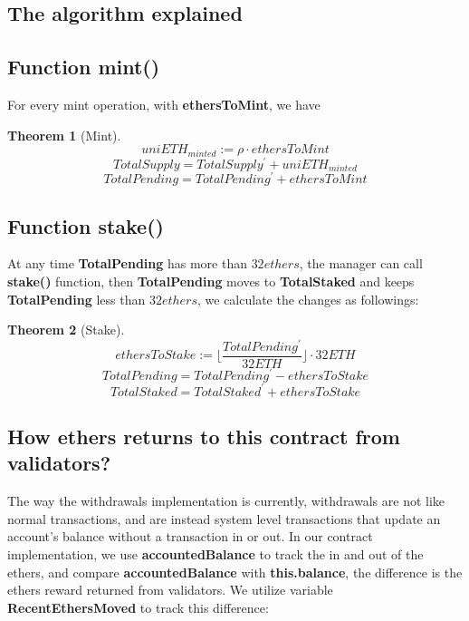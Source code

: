 \documentclass{article}
\begin{document}
\subsection{The algorithm explained}
\newtheorem{theorem}{Theorem}[section]
\newtheorem{corollary}{Corollary}[theorem]
\newtheorem{lemma}[theorem]{Lemma}

\subsection{Function mint()}
For every mint operation, with \textbf{ethersToMint}, we have 

\begin{theorem}[Mint]
\label{Mint}
\[uniETH_{minted} := \rho \cdot ethersToMint \]
\[TotalSupply = TotalSupply^{\prime} + uniETH_{minted} \]
\[TotalPending = TotalPending^{\prime} + ethersToMint\]
\end{theorem}

\subsection{Function stake()}
At any time \textbf{TotalPending} has more than $32 ethers$, the manager can call \textbf{stake()} function, then \textbf{TotalPending} moves to \textbf{TotalStaked} and keeps \textbf{TotalPending} less than $32 ethers$, we calculate the changes as followings:
\begin{theorem}[Stake]
\label{Stake}
\[ethersToStake := \lfloor\frac{TotalPending^{\prime}}{32ETH}\rfloor \cdot 32ETH\]
\[TotalPending = TotalPending^{\prime} - ethersToStake \]
\[TotalStaked = TotalStaked^{\prime} + ethersToStake \]
\end{theorem}

\subsection{How ethers returns to this contract from validators? }
\label{sectionAccounting}

The way the withdrawals implementation is currently, withdrawals are not like normal transactions, and are instead system level transactions that update an account's balance without a transaction in or out. In our contract implementation, we use \textbf{accountedBalance} to track the in and out of the ethers, and compare \textbf{accountedBalance} with \textbf{this.balance}, the difference is the ethers reward returned from validators. We utilize variable \textbf{RecentEthersMoved} to track this difference:
\end{document}
